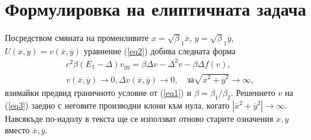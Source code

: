 \documentclass{article}
\newcommand{\rf}[1]{(\ref{#1})}
\begin{document}
\section{Формулировка на елиптичната задача}
Посредством смяната на променливите $x=\sqrt\beta_1 { \overline x}$, $y=\sqrt\beta_1 { \overline y}$, $U(x,y)= v({ \overline x},{ \overline y} )$ уравнение 
\rf{eq2} добива следната форма
 \begin{align}\label{eq3}
&c^2 \beta (E_1- \Delta) v_{{\overline y}{\overline y}} = \beta \Delta v - \Delta^2 v - \beta \Delta f(v), \\ 
&v(\overline x, \overline y) \rightarrow 0,  \Delta v(\overline x, \overline y) \rightarrow 0 ,  \quad \text{за}  \sqrt{\overline x^2 + \overline y^2} \rightarrow \infty, \nonumber
\end{align}
взимайки предвид граничното условие от \rf{eq1} и $\beta = \beta_1 / \beta_2$.
Решението $v$ на \rf{eq3} заедно с неговите производни клони към нула, когато $|{\overline x}^2 +{\overline y}^2|\rightarrow \infty$.
Навсякъде по-надолу в текста ще се използват отново старите означения $x,y$ вместо ${\overline x},{\overline y}$.
\end{document}
